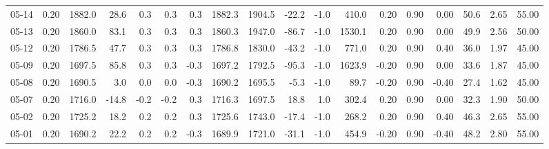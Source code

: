 \begin{threeparttable}
{\begin{tabular}{lrrrrrrrrrrrrrrrrr}
  05-14 &     0.20 & 1882.0 &              28.6 &               0.3 &                0.3 &                0.3 & 1882.3 & 1904.5 &      -22.2 &                     -1.0 &               410.0 &       0.20 &      0.90 &           0.00 &             50.6 &            2.65 &                  55.00 \\
  05-13 &     0.20 & 1860.0 &              83.1 &               0.3 &                0.3 &                0.3 & 1860.3 & 1947.0 &      -86.7 &                     -1.0 &              1530.1 &       0.20 &      0.90 &           0.00 &             49.9 &            2.56 &                  50.00 \\
  05-12 &     0.20 & 1786.5 &              47.7 &               0.3 &                0.3 &                0.3 & 1786.8 & 1830.0 &      -43.2 &                     -1.0 &               771.0 &       0.20 &      0.90 &           0.40 &             36.0 &            1.97 &                  45.00 \\
  05-09 &     0.20 & 1697.5 &              85.8 &               0.3 &                0.3 &               -0.3 & 1697.2 & 1792.5 &      -95.3 &                     -1.0 &              1623.9 &      -0.20 &      0.90 &           0.00 &             33.6 &            1.87 &                  45.00 \\
  05-08 &     0.20 & 1690.5 &               3.0 &               0.0 &                0.0 &               -0.3 & 1690.2 & 1695.5 &       -5.3 &                     -1.0 &                89.7 &      -0.20 &      0.90 &          -0.40 &             27.4 &            1.62 &                  45.00 \\
  05-07 &     0.20 & 1716.0 &             -14.8 &              -0.2 &               -0.2 &                0.3 & 1716.3 & 1697.5 &       18.8 &                      1.0 &               302.4 &       0.20 &      0.90 &           0.00 &             32.3 &            1.90 &                  50.00 \\
  05-02 &     0.20 & 1725.2 &              18.2 &               0.2 &                0.2 &                0.3 & 1725.6 & 1743.0 &      -17.4 &                     -1.0 &               268.2 &       0.20 &      0.90 &           0.40 &             46.3 &            2.65 &                  55.00 \\
  05-01 &     0.20 & 1690.2 &              22.2 &               0.2 &                0.2 &               -0.3 & 1689.9 & 1721.0 &      -31.1 &                     -1.0 &               454.9 &      -0.20 &      0.90 &          -0.40 &             48.2 &            2.80 &                  55.00 \\

\end{tabular}}
\end{threeparttable}
